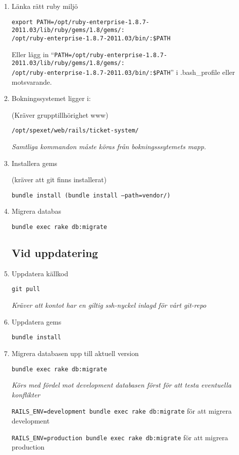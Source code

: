 \documentclass[a4paper, twoside, 11pt, titlepage]{article}
\begin{document}
	\begin{enumerate}
	\item Länka rätt ruby miljö

	{\tt export PATH=/opt/ruby-enterprise-1.8.7-2011.03/lib/ruby/gems/1.8/gems/:\\/opt/ruby-enterprise-1.8.7-2011.03/bin/:\$PATH}

	Eller lägg in ``{\tt PATH=/opt/ruby-enterprise-1.8.7-2011.03/lib/ruby/gems/1.8/gems/:\\/opt/ruby-enterprise-1.8.7-2011.03/bin/:\$PATH}'' i .bash\_profile eller motsvarande.

	\item Bokningssystemet ligger i:

	(Kräver grupptillhörighet www)

	{\tt /opt/spexet/web/rails/ticket-system/}

	\emph{Samtliga kommandon måste köras från bokningsssytemets mapp.}

	\item Installera gems

	(kräver att git finns installerat)

	{\tt bundle install (bundle install --path=vendor/)}

	\item Migrera databas

	{\tt bundle exec rake db:migrate}

	\subsection{Vid uppdatering}


	\item Uppdatera källkod

	{\tt git pull}

	\emph{Kräver att kontot har en giltig ssh-nyckel inlagd för vårt git-repo}

	\item Uppdatera gems

	{\tt bundle install}

	\item Migrera databasen upp till aktuell version

	{\tt bundle exec rake db:migrate}

	\emph{Körs med fördel mot development databasen först för att testa eventuella konflikter}

	{\tt RAILS\_ENV=development bundle exec rake db:migrate} för att migrera development

	{\tt RAILS\_ENV=production bundle exec rake db:migrate} för att migrera production
	\end{enumerate}
\end{document}
